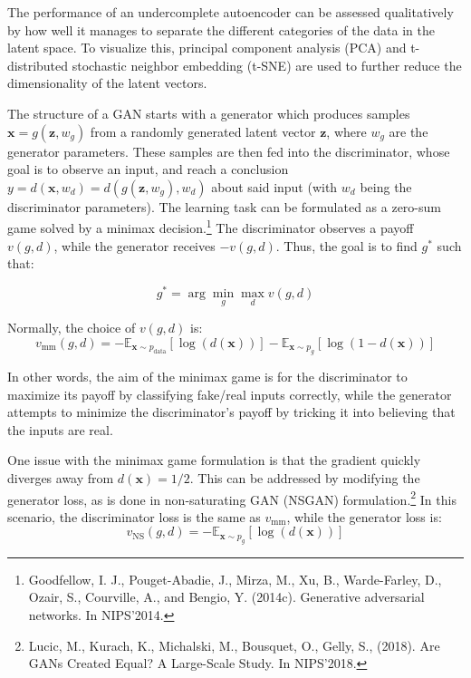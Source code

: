 \documentclass[11pt]{article} %
\begin{document}
\noindent The performance of an undercomplete autoencoder can be assessed qualitatively by how well it manages to separate the different categories of the data in the latent space. To visualize this, principal component analysis (PCA) and t-distributed stochastic neighbor embedding (t-SNE) are used to further reduce the dimensionality of the latent vectors.

\noindent The structure of a GAN starts with a generator which produces samples $\mathbf{x} = g(\mathbf{z},w_{g})$ from a randomly generated latent vector $\mathbf{z}$, where $w_{g}$ are the generator parameters. These samples are then fed into the discriminator, whose goal is to observe an input, and reach a conclusion $y = d(\mathbf{x}, w_{d}) = d(g(\mathbf{z},w_{g}), w_{d})$ about said input (with $w_{d}$ being the discriminator parameters). The learning task can be formulated as a zero-sum game solved by a minimax decision.\footnote{Goodfellow, I. J., Pouget-Abadie, J., Mirza, M., Xu, B., Warde-Farley, D., Ozair, S.,
Courville, A., and Bengio, Y. (2014c). Generative adversarial networks. In NIPS’2014.} The discriminator observes a payoff $v(g, d)$, while the generator receives $-v(g,d)$. Thus, the goal is to find $g^*$ such that:

\begin{equation}
    g^* = \arg\min_{g}\max_{d} v(g,d)
\end{equation}

Normally, the choice of $v(g, d)$ is:
\begin{equation}
    v_{\text{mm}}(g,d) = - \mathbb{E}_{\mathbf{x}\sim p_{\text{data}}}[\log(d(\mathbf{x}))] - \mathbb{E}_{\mathbf{x}\sim p_{g}}[\log(1 - d(\mathbf{x}))]
\end{equation}

In other words, the aim of the minimax game is for the discriminator to maximize its payoff by classifying fake/real inputs correctly, while the generator attempts to minimize the discriminator's payoff by tricking it into believing that the inputs are real.

\noindent One issue with the minimax game formulation is that the gradient quickly diverges away from $d(\mathbf{x}) = 1/2$. This can be addressed by modifying the generator loss, as is done in non-saturating GAN (NSGAN) formulation.\footnote{Lucic, M., Kurach, K., Michalski, M., Bousquet, O., Gelly, S.,  (2018). Are GANs Created Equal? A Large-Scale Study. In NIPS'2018.} In this scenario, the discriminator loss is the same as $v_{\text{mm}}$, while the generator loss is:
\begin{equation}
    v_{\text{NS}}(g,d) = - \mathbb{E}_{\mathbf{x}\sim p_{g}}[\log(d(\mathbf{x}))]
\end{equation}
\end{document}
